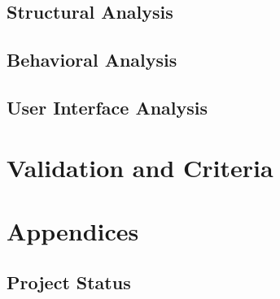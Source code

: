 \documentclass[12pt]{article}
\begin{document}
\subsection{Structural Analysis}\label{struct-analysis-BC}

\subsection{Behavioral Analysis}\label{behavioral-analysis-HR}

\subsection{User Interface Analysis}\label{UI-analysis-CA}

\section{Validation and Criteria}\label{validation-BC}

\section{Appendices}

\subsection{Project Status}\label{status-ST}
\end{document}
